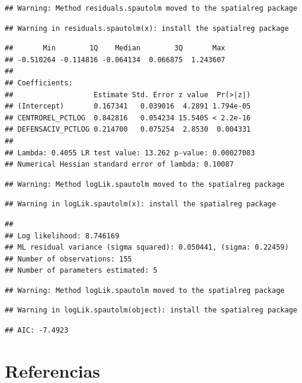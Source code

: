 \documentclass[11pt,]{article}
\begin{document}
\begin{verbatim}
## Warning: Method residuals.spautolm moved to the spatialreg package
\end{verbatim}

\begin{verbatim}
## Warning in residuals.spautolm(x): install the spatialreg package
\end{verbatim}

\begin{verbatim}
##       Min        1Q    Median        3Q       Max 
## -0.510264 -0.114816 -0.064134  0.066875  1.243607 
## 
## Coefficients: 
##                   Estimate Std. Error z value  Pr(>|z|)
## (Intercept)       0.167341   0.039016  4.2891 1.794e-05
## CENTROREL_PCTLOG  0.842816   0.054234 15.5405 < 2.2e-16
## DEFENSACIV_PCTLOG 0.214700   0.075254  2.8530  0.004331
## 
## Lambda: 0.4055 LR test value: 13.262 p-value: 0.00027083 
## Numerical Hessian standard error of lambda: 0.10087
\end{verbatim}

\begin{verbatim}
## Warning: Method logLik.spautolm moved to the spatialreg package
\end{verbatim}

\begin{verbatim}
## Warning in logLik.spautolm(x): install the spatialreg package
\end{verbatim}

\begin{verbatim}
## 
## Log likelihood: 8.746169 
## ML residual variance (sigma squared): 0.050441, (sigma: 0.22459)
## Number of observations: 155 
## Number of parameters estimated: 5
\end{verbatim}

\begin{verbatim}
## Warning: Method logLik.spautolm moved to the spatialreg package
\end{verbatim}

\begin{verbatim}
## Warning in logLik.spautolm(object): install the spatialreg package
\end{verbatim}

\begin{verbatim}
## AIC: -7.4923
\end{verbatim}

\section{Referencias}\label{referencias}
\end{document}
